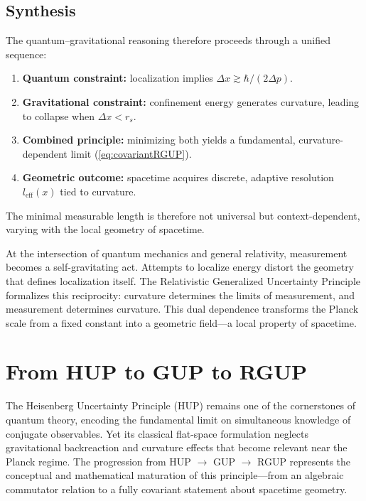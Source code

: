 \documentclass[11pt,oneside]{book}
\newenvironment{booknote}{
  \begin{tcolorbox}[
    colback=gray!3!white,
    colframe=gray!45!black,
    fonttitle=\bfseries,
    title=\textbf{Book Note},
  ]
}{\end{tcolorbox}}
\numberwithin{equation}{chapter}
\begin{document}
\subsection*{Synthesis}

The quantum--gravitational reasoning therefore proceeds through a unified sequence:
\begin{enumerate}
\item \textbf{Quantum constraint:} localization implies $\Delta x \gtrsim \hbar/(2\Delta p)$.  
\item \textbf{Gravitational constraint:} confinement energy generates curvature, leading to collapse when $\Delta x<r_s$.  
\item \textbf{Combined principle:} minimizing both yields a fundamental, curvature-dependent limit (\ref{eq:covariantRGUP}).  
\item \textbf{Geometric outcome:} spacetime acquires discrete, adaptive resolution $l_{\text{eff}}(x)$ tied to curvature.  
\end{enumerate}
The minimal measurable length is therefore not universal but context-dependent, varying with the local geometry of spacetime. \vspace{0.8em}

\begin{booknote}
At the intersection of quantum mechanics and general relativity, measurement becomes a self-gravitating act.  
Attempts to localize energy distort the geometry that defines localization itself.  
The Relativistic Generalized Uncertainty Principle formalizes this reciprocity: curvature determines the limits of measurement, and measurement determines curvature.  
This dual dependence transforms the Planck scale from a fixed constant into a geometric field---a local property of spacetime.
\end{booknote}
\clearpage
\section{From HUP to GUP to RGUP}

The Heisenberg Uncertainty Principle (HUP) remains one of the cornerstones of quantum theory, encoding the fundamental limit on simultaneous knowledge of conjugate observables.  
Yet its classical flat-space formulation neglects gravitational backreaction and curvature effects that become relevant near the Planck regime.  
The progression from HUP $\rightarrow$ GUP $\rightarrow$ RGUP represents the conceptual and mathematical maturation of this principle—from an algebraic commutator relation to a fully covariant statement about spacetime geometry.
\end{document}
